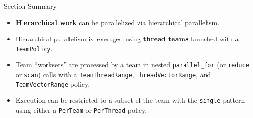 \begin{frame}{Section Summary}

  \begin{itemize}
    \item{\textbf{Hierarchical work} can be parallelized via hierarchical parallelism.}
    \item{Hierarchical parallelism is leveraged using \textbf{thread teams} launched with a \texttt{TeamPolicy}.}
    \item{Team ``worksets'' are processed by a team in nested \texttt{parallel\_for} (or \texttt{reduce} or \texttt{scan}) calls with a \texttt{TeamThreadRange}, \texttt{ThreadVectorRange}, and \texttt{TeamVectorRange} policy.}
    \item{Execution can be restricted to a subset of the team with the \texttt{single} pattern using either a \texttt{PerTeam} or \texttt{PerThread} policy.}
  \end{itemize}

\end{frame}
